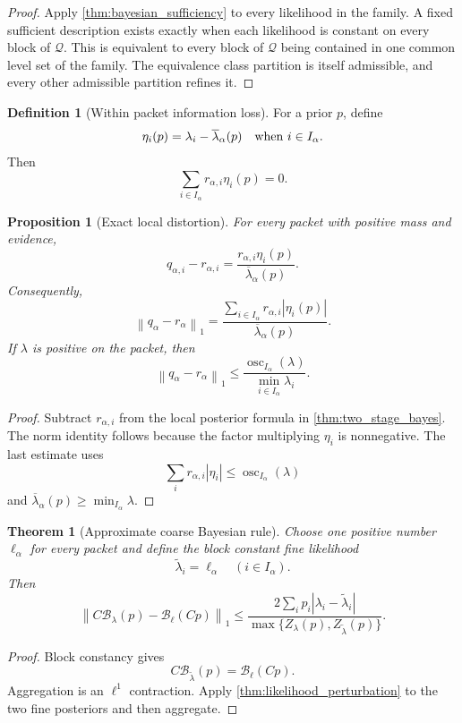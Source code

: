 \documentclass{aomart}
\newtheorem{theorem}{Theorem}[section]
\newtheorem{proposition}[proposition]{Proposition}
\theoremstyle{definition}
\newtheorem{definition}[definition]{Definition}
\theoremstyle{remark}
\newcommand{\Bcal}{\mathcal B}
\newcommand{\osc}{\operatorname{osc}}
\newcommand{\norm}[1]{\left\lVert#1\right\rVert}
\newcommand{\abs}[1]{\left\lvert#1\right\rvert}
\begin{document}
\begin{proof}
Apply \cref{thm:bayesian_sufficiency} to every likelihood in the family. A fixed sufficient description exists exactly when each likelihood is constant on every block of \(\mathcal Q\). This is equivalent to every block of \(\mathcal Q\) being contained in one common level set of the family. The equivalence class partition is itself admissible, and every other admissible partition refines it.
\end{proof}

\begin{definition}[Within packet information loss]
For a prior \(p\), define
\[
\eta_i(p)
=
\lambda_i-\overline\lambda_\alpha(p)
\quad\hbox{when }i\in I_\alpha.
\]
Then
\[
\sum_{i\in I_\alpha}r_{\alpha,i}\eta_i(p)=0.
\]
\end{definition}

\begin{proposition}[Exact local distortion]\label{prop:local_bayes_distortion}
For every packet with positive mass and evidence,
\[
q_{\alpha,i}-r_{\alpha,i}
=
\frac{r_{\alpha,i}\eta_i(p)}
{\overline\lambda_\alpha(p)}.
\]
Consequently,
\[
\norm{q_\alpha-r_\alpha}_1
=
\frac{
\sum_{i\in I_\alpha}r_{\alpha,i}\abs{\eta_i(p)}
}{\overline\lambda_\alpha(p)}.
\]
If \(\lambda\) is positive on the packet, then
\[
\norm{q_\alpha-r_\alpha}_1
\leq
\frac{\osc_{I_\alpha}(\lambda)}
{\min_{i\in I_\alpha}\lambda_i}.
\]
\end{proposition}

\begin{proof}
Subtract \(r_{\alpha,i}\) from the local posterior formula in \cref{thm:two_stage_bayes}. The norm identity follows because the factor multiplying \(\eta_i\) is nonnegative. The last estimate uses
\[
\sum_i r_{\alpha,i}\abs{\eta_i}
\leq
\osc_{I_\alpha}(\lambda)
\]
and \(\overline\lambda_\alpha(p)\geq\min_{I_\alpha}\lambda\).
\end{proof}

\begin{theorem}[Approximate coarse Bayesian rule]\label{thm:approximate_coarse_bayes}
Choose one positive number \(\ell_\alpha\) for every packet and define the block constant fine likelihood
\[
\widetilde\lambda_i=\ell_\alpha
\quad(i\in I_\alpha).
\]
Then
\[
\norm{
C\Bcal_\lambda(p)-\Bcal_\ell(Cp)
}_1
\leq
\frac{
2\sum_i p_i\abs{\lambda_i-\widetilde\lambda_i}
}{
\max\{Z_\lambda(p),Z_{\widetilde\lambda}(p)\}
}.
\]
\end{theorem}

\begin{proof}
Block constancy gives
\[
C\Bcal_{\widetilde\lambda}(p)
=
\Bcal_\ell(Cp).
\]
Aggregation is an \(\ell^1\) contraction. Apply \cref{thm:likelihood_perturbation} to the two fine posteriors and then aggregate.
\end{proof}
\end{document}
